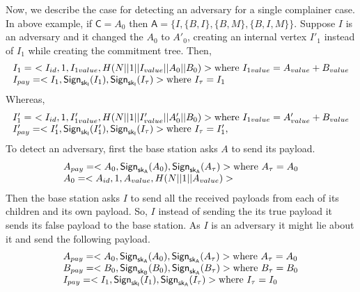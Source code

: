 		Now, we describe the case for detecting an adversary for a single complainer case.
		In above example, if $\textsf{C} = {A_{0}}$ then $\textsf{A}=\{I,\{B,I\},\{B,M\},\{B,I,M\}\}$.
		Suppose $I$ is an adversary and it changed the $A_{0}$ to $A'_{0}$, creating an internal vertex $I'_{1}$ instead of $I_{1}$ while creating the commitment tree. 
		Then,
		\begin{equation*}
			\begin{array}{l}
				I_{1} =\ <I_{id}, 1, I_{1value}, H(N||1||I_{value}||A_{0}||B_{0})> \mbox{where}\ I_{1value} = A_{value} + B_{value}\\	
				I_{pay} = <I_{1}, \textsf{Sign}_{\sf{sk}_{I}}(I_{1}), \textsf{Sign}_{\sf{sk}_{I}}(I_{\tau})> \mbox{where}\ I_{\tau} = I_{1}\\
			\end{array}
		\end{equation*}
		Whereas,
		\begin{equation*}
			\begin{array}{l}
				I'_{1} =\ <I_{id}, 1, I'_{1value}, H(N||1||I'_{value}||A'_{0}||B_{0})> \mbox{where}\ I_{1value} = A'_{value} + B_{value}\\
				I'_{pay} = <I'_{1}, \textsf{Sign}_{\sf{sk}_{I}}(I'_{1}), \textsf{Sign}_{\sf{sk}_{I}}(I_{\tau})> \mbox{where}\ I_{\tau} = I'_{1},\\
			\end{array}
		\end{equation*}
		To detect an adversary, first the base station asks $A$ to send its payload.
		\begin{equation*}
			\begin{array}{l}
			A_{pay} = <A_{0}, \textsf{Sign}_{\sf{sk}_{A}}(A_{0}), \textsf{Sign}_{\sf{sk}_{A}}(A_{\tau})> \mbox{where}\ A_{\tau} = A_{0}\\
			A_{0} = <A_{id}, 1, A_{value}, H(N||1||A_{value})>
			\end{array}
		\end{equation*}
		Then the base station asks $I$ to send all the received payloads from each of its children and its own payload.
		So, $I$ instead of sending the its true payload it sends its false payload to the base station.
		As $I$ is an adversary it might lie about it and send the following payload.
		\begin{equation*}
			\begin{array}{l}
				A_{pay} = <A_{0}, \textsf{Sign}_{\sf{sk}_{A}}(A_{0}), \textsf{Sign}_{\sf{sk}_{A}}(A_{\tau})> \mbox{where}\ A_{\tau} = A_{0}\\
				B_{pay} = <B_{0}, \textsf{Sign}_{\sf{sk}_{B}}(B_{0}), \textsf{Sign}_{\sf{sk}_{A}}(B_{\tau})> \mbox{where}\ B_{\tau} = B_{0}\\
				I_{pay} = <I_{1}, \textsf{Sign}_{\sf{sk}_{I}}(I_{1}), \textsf{Sign}_{\sf{sk}_{A}}(I_{\tau})> \mbox{where}\ I_{\tau} = I_{0}\\
			\end{array}
		\end{equation*}
